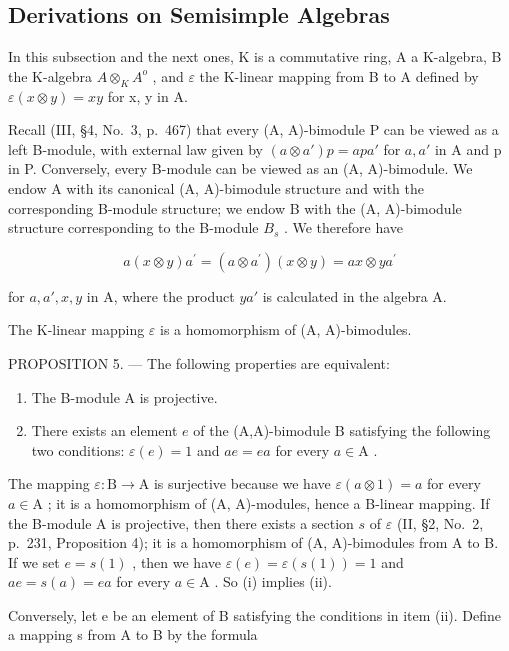 \subsection{Derivations on Semisimple Algebras}

In this subsection and the next ones, K is a commutative ring, A a K-algebra, B the K-algebra \(A \otimes_{K} A^{o}\) , and \(\varepsilon\) the K-linear mapping from B to A defined by \(\varepsilon(x \otimes y) = xy\) for x, y in A.

Recall (III, §4, No.~3, p.~467) that every (A, A)-bimodule P can be viewed as a left B-module, with external law given by \((a \otimes a')p = apa'\) for \(a, a'\) in A and p in P. Conversely, every B-module can be viewed as an (A, A)-bimodule. We endow A with its canonical (A, A)-bimodule structure and with the corresponding B-module structure; we endow B with the (A, A)-bimodule structure corresponding to the B-module \(B_s\) . We therefore have

\[
a (x \otimes y) a ^ {\prime} = (a \otimes a ^ {\prime}) (x \otimes y) = a x \otimes y a ^ {\prime}
\]

for \(a, a', x, y\) in A, where the product \(ya'\) is calculated in the algebra A.

The K-linear mapping \(\varepsilon\) is a homomorphism of (A, A)-bimodules.

PROPOSITION 5. --- The following properties are equivalent:

\begin{enumerate}
\def\labelenumi{(\roman{enumi})}
\item
  The B-module A is projective.
\item
  There exists an element \(e\) of the (A,A)-bimodule B satisfying the following two conditions: \(\varepsilon(e) = 1\) and \(ae = ea\) for every \(a \in \mathrm{A}\) .
\end{enumerate}

The mapping \(\varepsilon: \mathrm{B} \to \mathrm{A}\) is surjective because we have \(\varepsilon(a \otimes 1) = a\) for every \(a \in \mathrm{A}\) ; it is a homomorphism of (A, A)-modules, hence a B-linear mapping. If the B-module A is projective, then there exists a section \(s\) of \(\varepsilon\) (II, §2, No.~2, p.~231, Proposition 4); it is a homomorphism of (A, A)-bimodules from A to B. If we set \(e = s(1)\) , then we have \(\varepsilon(e) = \varepsilon(s(1)) = 1\) and \(ae = s(a) = ea\) for every \(a \in \mathrm{A}\) . So (i) implies (ii).

Conversely, let e be an element of B satisfying the conditions in item (ii). Define a mapping s from A to B by the formula

